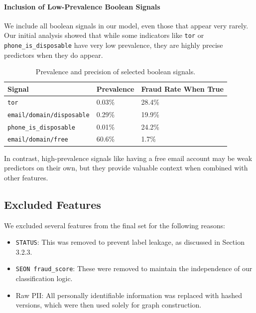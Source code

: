 \paragraph{Inclusion of Low-Prevalence Boolean Signals}
We include all boolean signals in our model, even those that appear very rarely. Our initial analysis showed that while some indicators like \texttt{tor} or \texttt{phone\_is\_disposable} have very low prevalence, they are highly precise predictors when they do appear.

\begin{table}[h]
\centering
\caption{Prevalence and precision of selected boolean signals.}
\begin{tabular}{lll}
\hline
Signal & Prevalence & Fraud Rate When True \\
\hline
\texttt{tor} & 0.03\% & 28.4\% \\
\texttt{email/domain/disposable} & 0.29\% & 19.9\% \\
\texttt{phone\_is\_disposable} & 0.01\% & 24.2\% \\
\texttt{email/domain/free} & 60.6\% & 1.7\% \\
\hline
\end{tabular}
\end{table}

In contrast, high-prevalence signals like having a free email account may be weak predictors on their own, but they provide valuable context when combined with other features.

\subsection{Excluded Features}
We excluded several features from the final set for the following reasons:
\begin{itemize}
    \item \texttt{STATUS}: This was removed to prevent label leakage, as discussed in Section 3.2.3.
    \item \texttt{SEON fraud\_score}: These were removed to maintain the independence of our classification logic.
    \item Raw PII: All personally identifiable information was replaced with hashed versions, which were then used solely for graph construction.
\end{itemize}
